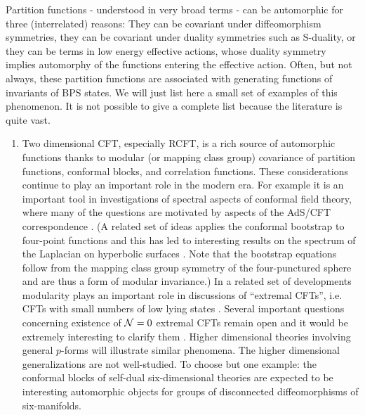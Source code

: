 \documentclass[12pt]{article}
\begin{document}
Partition functions - understood in very broad terms - can be automorphic for
three (interrelated) reasons: They can be covariant under diffeomorphism symmetries,
they can be covariant under duality symmetries such as S-duality, or they can be
terms in low energy effective actions, whose duality symmetry implies automorphy
of the functions entering the effective action. Often, but not always, these partition
functions are associated with generating functions of invariants of BPS states.
We will just list here a small set of examples of this phenomenon. It is not possible
to give a complete list because the literature is quite vast.


\begin{enumerate}

\item Two dimensional CFT, especially RCFT, is a rich source of automorphic
functions thanks to modular (or mapping class group) covariance of partition functions, conformal blocks, and correlation functions. These considerations continue to play an important role in the modern era.
For example it is an important tool in investigations
of spectral aspects of conformal field theory, where many of the 
questions are motivated by aspects of the AdS/CFT correspondence
\cite{Ganguly:2019ksp,Hartman:2014oaa,Kaidi:2020ecu,Keller:2014xba}.
(A related set of ideas applies the conformal bootstrap to four-point 
functions and this has led to interesting results on the spectrum of the Laplacian on hyperbolic surfaces \cite{Kravchuk:2021akc}. Note that the bootstrap equations follow from the mapping class group symmetry of the four-punctured sphere and are thus a form of modular invariance.)
 In a related
set of developments  modularity plays an important role in discussions of
``extremal CFTs'', i.e.  CFTs with small numbers of low lying states 
\cite{Hohn-Extremal,Witten:2007kt,Gaberdiel:2008xb}. Several important questions concerning
existence of ${\cal{N}}=0$ extremal CFTs remain open and it would be 
extremely interesting to clarify them \cite{Witten:2007kt,Ferrari:2017kbp,Gaberdiel:2008xb,Gaiotto:2007xh,Gaiotto:2008jt,Harrison:2016hbq}.
Higher dimensional theories involving
general $p$-forms will illustrate similar phenomena. The higher dimensional generalizations
are not well-studied. To choose but one example: the conformal blocks of self-dual six-dimensional
theories are expected to be interesting automorphic objects for groups of disconnected diffeomorphisms
of six-manifolds.


\end{enumerate}
\end{document}
